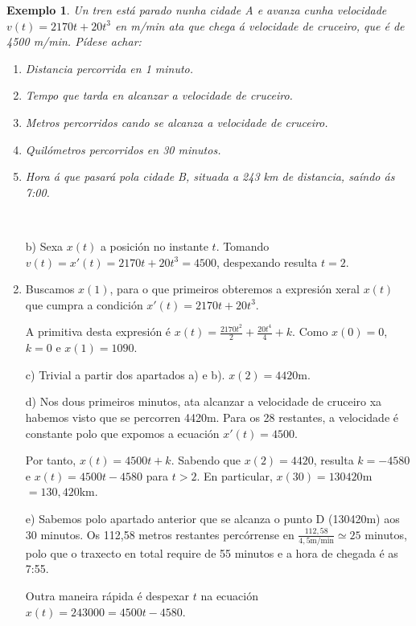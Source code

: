 \documentclass[11pt, a4paper,twoside]{article}
\makeatletter
\theoremstyle{theorem-style}  %
\renewenvironment{proof}[1][\proofname]{\par
	\pushQED{\qed}%
	\normalfont \topsep6\p@\@plus6\p@\relax
	\list{}{%
		\settowidth{\leftmargin}{\quad:\hskip\labelsep}%
		\setlength{\labelwidth}{0pt}%
		\setlength{\itemindent}{-\leftmargin}%
	}%
	\item[\hskip\labelsep\itshape#1\@addpunct{:}]\ignorespaces
}{%
	\popQED\endlist\@endpefalse
}
\theoremstyle{definition-style}
\theoremstyle{example-style}
\newtheorem{example}{Exemplo}[section]
\makeatother
\begin{document}
\begin{example}
	Un tren está parado nunha cidade A e avanza cunha velocidade $ v(t)=2170t+20t^3 $ en m/min ata que chega á velocidade de cruceiro, que é de 4500 m/min. Pídese achar:
	\begin{enumerate}[\qquad a)]
		\item Distancia percorrida en 1 minuto.
		\item Tempo que tarda en alcanzar a velocidade de cruceiro.
		\item Metros percorridos cando se alcanza a velocidade de cruceiro.
		\item Quilómetros percorridos en 30 minutos.
		\item Hora á que pasará pola cidade B, situada a 243 km de distancia, saíndo ás 7:00.
	\end{enumerate}
\end{example}
\begin{proof}[Solución] \ 
	\begin{enumerate}[\qquad a)]
	\item[b)] Sexa $x(t)$ a posición no instante $t$. Tomando $v(t)=x'(t)=2170t+20t^3=4500$, despexando resulta $ t=2 $. 
	
	\item Buscamos $ x(1) $, para o que primeiros obteremos a expresión xeral $ x(t) $ que cumpra a condición $ x'(t)=2170t+20t^3 $.
	
	A primitiva desta expresión é $ x(t)=\frac{2170t^2}{2}+\frac{20t^4}{4}+k $. Como $ x(0)=0 $, $ k=0 $ e $ x(1)=1090 $.
	
	\item[c)] Trivial a partir dos apartados a) e b). $ x(2)=4420 $m.
	
	\item[d)] Nos dous primeiros minutos, ata alcanzar a velocidade de cruceiro xa habemos visto que se percorren 4420m. Para os 28 restantes, a velocidade é constante polo que expomos a ecuación $ x'(t)=4500 $. 
	
	Por tanto, $ x(t)=4500t+k $. Sabendo que $ x(2)=4420 $, resulta $ k=-4580 $ e $ x(t)=4500t-4580 $ para $ t>2 $. En particular, $ x(30)=130420 $m $ =130,420 $km.
	
	\item[e)] Sabemos polo apartado anterior que se alcanza o punto D (130420m) aos 30 minutos. Os 112,58 metros restantes percórrense en $ \frac{112,58}{4,5\text{m/min}}\simeq 25 $ minutos, polo que o traxecto en total require de 55 minutos e a hora de chegada é as 7:55. 
	
	Outra maneira rápida é despexar $ t $ na ecuación $ x(t)= 243000=4500t-4580 $.
	\end{enumerate}
\end{proof}
\end{document}

